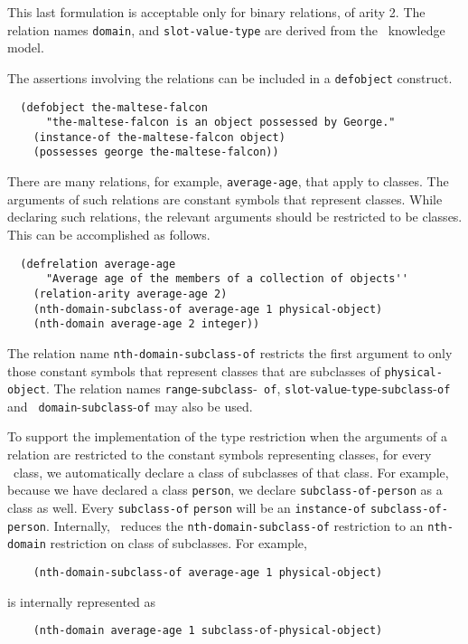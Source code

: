This last formulation is acceptable only for binary relations, of
arity 2.  The relation names \verb'domain', and \verb'slot-value-type'
are derived from the \okbc\   knowledge model.

The assertions involving the relations can be included in a
\verb'defobject' construct.
\begin{verbatim}
  (defobject the-maltese-falcon
      "the-maltese-falcon is an object possessed by George."
    (instance-of the-maltese-falcon object)
    (possesses george the-maltese-falcon))
\end{verbatim}

\label{subsubsec-subclasses}

There are many relations, for example, \verb'average-age', that apply
to classes.  The arguments of such relations are constant symbols that
represent classes.  While declaring such relations, the relevant
arguments should be restricted to be classes.  This can be accomplished
as follows.
\begin{verbatim}
  (defrelation average-age
      "Average age of the members of a collection of objects''
    (relation-arity average-age 2)
    (nth-domain-subclass-of average-age 1 physical-object)
    (nth-domain average-age 2 integer))
\end{verbatim}

The relation name \verb'nth-domain-subclass-of' restricts the first argument
to only those constant symbols that represent classes that are subclasses of
\verb'physical-object'.  The relation names {\tt range}-{\tt subclass}-{\tt
of}, {\tt slot}-{\tt value}-{\tt type}-{\tt subclass}-{\tt of} and {\tt
domain}-{\tt subclass}-{\tt of} may also be used.

To support the implementation of the type restriction when the
arguments of a relation are restricted to the constant symbols
representing classes, for every \kifsnark\  class, we automatically
declare a class of subclasses of that class.  For example, because we
have declared a class \verb'person', we declare
\verb'subclass-of-person' as a class as well.  Every \verb'subclass-of'
\verb'person' will be  an \verb'instance-of' \verb'subclass-of-person'.
Internally, \snark\  reduces the \verb'nth-domain-subclass-of'
restriction to an \verb'nth-domain' restriction on class of
subclasses.  For example,
\begin{verbatim}
    (nth-domain-subclass-of average-age 1 physical-object)
\end{verbatim}
is internally represented as
\begin{verbatim}
    (nth-domain average-age 1 subclass-of-physical-object)
\end{verbatim}

